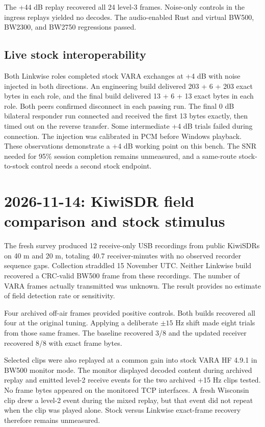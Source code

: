 \documentclass[11pt,a4paper]{article}
\begin{document}
The +44 dB replay recovered all 24 level-3 frames. Noise-only
controls in the ingress replays yielded no decodes. The audio-enabled
Rust and virtual BW500, BW2300, and BW2750 regressions passed.

\subsection{Live stock interoperability}

Both Linkwise roles completed stock VARA exchanges at +4 dB with
noise injected in both directions. An engineering build delivered
203 + 6 + 203 exact bytes in each role, and the final build delivered
13 + 6 + 13 exact bytes in each role. Both peers confirmed disconnect
in each passing run. The final 0 dB bilateral responder run connected
and received the first 13 bytes exactly, then timed out on the reverse
transfer. Some intermediate +4 dB trials failed during connection.
The injection was calibrated in PCM before Windows playback.
These observations demonstrate a +4 dB working point on this bench.
The SNR needed for 95\% session completion remains unmeasured, and a
same-route stock-to-stock control needs a second stock endpoint.

\section{2026-11-14: KiwiSDR field comparison and stock stimulus}
\label{sec:kiwi-nov14}

The fresh survey produced 12 receive-only USB recordings from public
KiwiSDRs on 40 m and 20 m, totaling 40.7 receiver-minutes with no
observed recorder sequence gaps. Collection straddled 15 November UTC.
Neither Linkwise build recovered a CRC-valid BW500 frame from these
recordings. The number of VARA frames actually transmitted was
unknown. The result provides no estimate of field detection rate or
sensitivity.

Four archived off-air frames provided positive controls. Both builds
recovered all four at the original tuning. Applying a deliberate
$\pm 15$ Hz shift made eight trials from those same frames. The
baseline recovered 3/8 and the updated receiver recovered 8/8 with
exact frame bytes.

Selected clips were also replayed at a common gain into stock VARA
HF 4.9.1 in BW500 monitor mode. The monitor displayed decoded content
during archived replay and emitted level-2 receive events for the
two archived +15 Hz clips tested. No frame bytes appeared on the
monitored TCP interfaces. A fresh Wisconsin clip drew a level-2
event during the mixed replay, but that event did not repeat when
the clip was played alone. Stock versus Linkwise exact-frame recovery
therefore remains unmeasured.
\end{document}
